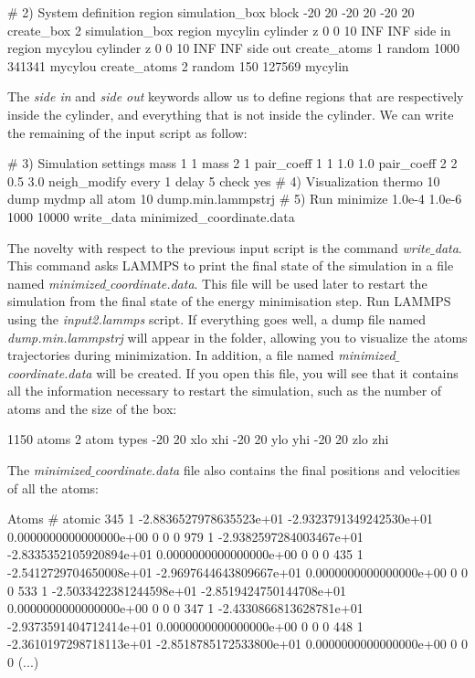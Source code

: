 \begin{lcverbatim}
# 2) System definition
region simulation_box block -20 20 -20 20 -20 20
create_box 2 simulation_box
region mycylin cylinder z 0 0 10 INF INF side in
region mycylou cylinder z 0 0 10 INF INF side out
create_atoms 1 random 1000 341341 mycylou
create_atoms 2 random 150 127569 mycylin
\end{lcverbatim}

\noindent The \textit{side in} and \textit{side out} keywords
allow us to define regions that are respectively inside the
cylinder, and everything that is not inside the cylinder.
We can write the remaining of the input script as follow:

\begin{lcverbatim}
# 3) Simulation settings
mass 1 1
mass 2 1
pair_coeff 1 1 1.0 1.0
pair_coeff 2 2 0.5 3.0
neigh_modify every 1 delay 5 check yes
# 4) Visualization
thermo 10
dump mydmp all atom 10 dump.min.lammpstrj
# 5) Run
minimize 1.0e-4 1.0e-6 1000 10000
write_data minimized_coordinate.data
\end{lcverbatim}

\noindent The novelty with respect to the previous
input script is the command \textit{write$\_$data}. This command
asks LAMMPS to print the final state of the simulation in
a file named \textit{minimized$\_$coordinate.data}. This file will
be used later to restart the simulation from the final
state of the energy minimisation step.
Run LAMMPS using the \textit{input2.lammps} script. If everything
goes well, a dump file named \textit{dump.min.lammpstrj} will
appear in the folder, allowing you to visualize the atoms
trajectories during minimization. In
addition, a file named \textit{minimized$\_$coordinate.data} will be
created. If you open this file, you will see that it
contains all the information necessary to restart the
simulation, such as the number of atoms and the size of
the box:

\begin{lcverbatim}
1150 atoms
2 atom types
-20 20 xlo xhi
-20 20 ylo yhi
-20 20 zlo zhi
\end{lcverbatim}

\noindent The \textit{minimized$\_$coordinate.data} file also contains the final
positions and velocities of all the atoms:

\begin{lcverbatim}
Atoms # atomic
345 1 -2.8836527978635523e+01 -2.9323791349242530e+01 0.0000000000000000e+00 0 0 0
979 1 -2.9382597284003467e+01 -2.8335352105920894e+01 0.0000000000000000e+00 0 0 0
435 1 -2.5412729704650008e+01 -2.9697644643809667e+01 0.0000000000000000e+00 0 0 0
533 1 -2.5033422381244598e+01 -2.8519424750144708e+01 0.0000000000000000e+00 0 0 0
347 1 -2.4330866813628781e+01 -2.9373591404712414e+01 0.0000000000000000e+00 0 0 0
448 1 -2.3610197298718113e+01 -2.8518785172533800e+01 0.0000000000000000e+00 0 0 0
(...)
\end{lcverbatim}

